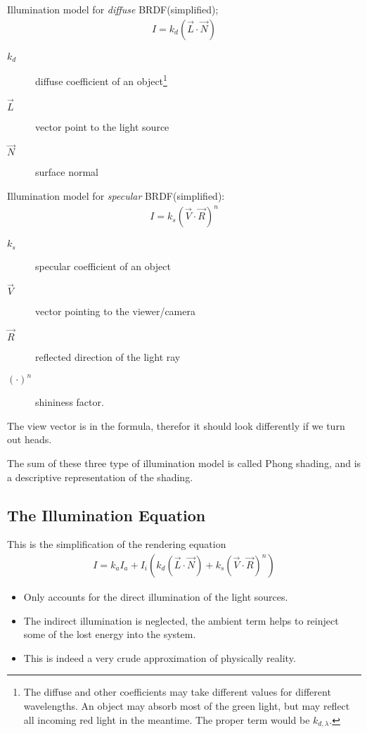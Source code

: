 \documentclass[10pt]{armath}
\numberwithin{equation}{section}
\theoremstyle{definition}
\begin{document}
\begin{multicols}{2}
  Illumination model for \textit{diffuse} BRDF(simplified);
  \begin{align*}
    I=k_d\left(\vec{L}\cdot\vec{N}\right)
  \end{align*}
  \begin{description}
    \item[$k_d$] diffuse coefficient of an object\footnote{The diffuse and other
        coefficients may take different values for different wavelengths. An
        object may absorb most of the green light, but may reflect all incoming
        red light in the meantime. The proper term would be $k_{d,\lambda}$.}
    \item[$\vec{L}$] vector point to the light source
    \item[$\vec{N}$] surface normal
  \end{description}

  Illumination model for \textit{specular} BRDF(simplified):
  \begin{align*}
    I=k_s{\left(\vec{V}\cdot\vec{R}\right)}^n
  \end{align*}
  \begin{description}
    \item[$k_s$] specular coefficient of an object
    \item[$\vec{V}$] vector pointing to the viewer/camera
    \item[$\vec{R}$] reflected direction of the light ray
    \item[${\left(\cdot\right)}^n$] shininess factor.
  \end{description}
  The view vector is in the formula, therefor it should look differently if we
  turn out heads.

  The sum of these three type of illumination model is called Phong shading, and
  is a descriptive representation of the shading.

  \subsection{The Illumination Equation}%
  \label{sub:the_illumination_equation}

  This is the simplification of the rendering equation
  \begin{align*}
    I=k_aI_a+I_i\left(k_d\left(\vec{L}\cdot\vec{N}\right)+k_s{\left(\vec{V}\cdot\vec{R}\right)}^n\right)
  \end{align*}
  \begin{itemize}
    \item Only accounts for the direct illumination of the light sources.
    \item The indirect illumination is neglected, the ambient term helps to
      reinject some of the lost energy into the system.
    \item This is indeed a very crude approximation of physically reality.
  \end{itemize}


\end{multicols}
\end{document}
